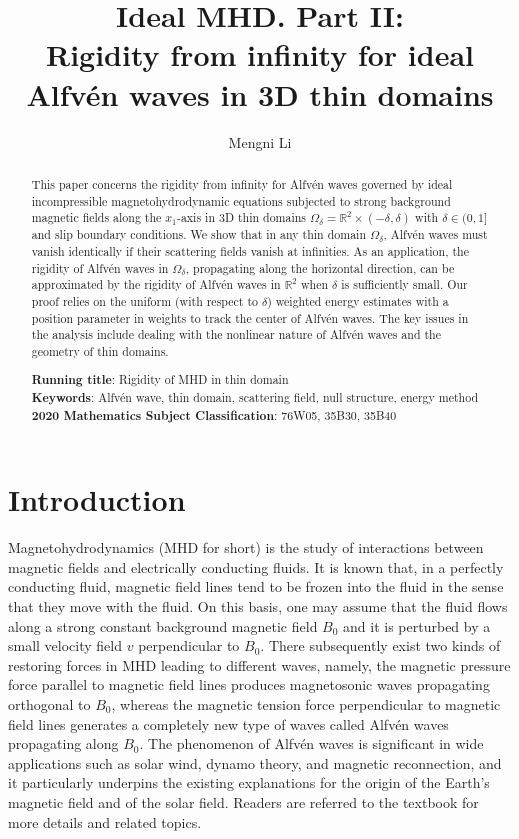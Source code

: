\documentclass[10pt,reqno]{amsart}
\title[Rigidity of MHD in thin domain]{Ideal MHD. Part II:\\ Rigidity from infinity for ideal Alfv\'en waves in 3D thin domains}
\author[Mengni Li]{Mengni Li}
\numberwithin{equation}{section}
\begin{document}
\begin{abstract}
This paper concerns 
the rigidity from infinity for Alfv\'en waves governed by  ideal incompressible magnetohydrodynamic  equations subjected to 
strong background magnetic fields 
along the $x_1$-axis in 3D  thin domains $\Omega_\delta=\mathbb{R}^2\times(-\delta,\delta)$ with $\delta\in(0,1]$ and slip boundary conditions. 
We show that 
in any thin domain $\Omega_\delta$,  
Alfv\'en waves must vanish identically if their scattering fields vanish at infinities. 
As an application, the rigidity of Alfv\'en waves in $\Omega_{\delta}$, propagating along the horizontal direction, can be approximated by the rigidity of Alfv\'en waves in $\mathbb{R}^2$ 
when $\delta$ is sufficiently small. Our proof relies on 
the uniform (with respect to $\delta$) weighted energy estimates with a position parameter in weights to track the center of Alfv\'en waves. The key issues in the analysis 
include dealing with the nonlinear nature of Alfv\'en waves and the geometry of thin domains. 



	
\smallskip
	
\noindent
\textbf{Running title}: Rigidity of MHD	in thin domain\\
\textbf{Keywords}: 	Alfv\'en wave, 
 thin domain, scattering field, null structure, energy method\\
\textbf{2020 Mathematics Subject Classification}: 76W05, 35B30, 35B40
\end{abstract}


\maketitle
\tableofcontents

\section{Introduction}



Magnetohydrodynamics (MHD for short) is the study of interactions between magnetic fields and electrically conducting fluids. 
It is known that, in a perfectly conducting fluid, magnetic field lines 
tend to be frozen into the fluid in the sense that they move with the fluid. On this basis, one may assume that the fluid flows along a strong constant background magnetic field $B_0$ and it is perturbed by a small velocity field $v$ perpendicular to $B_0$. 
There subsequently exist two kinds of restoring forces in MHD leading to different waves, namely, the magnetic pressure force parallel to magnetic field lines produces 
magnetosonic waves propagating orthogonal to $B_0$, whereas the  magnetic tension force perpendicular 
 to magnetic field lines generates a completely new type of waves called Alfv\'en waves propagating 
 along $B_0$. The phenomenon of Alfv\'en waves is significant 
  in wide applications  such as solar wind, dynamo theory, and magnetic reconnection, 
and it  particularly underpins the existing explanations for the origin of the Earth's magnetic field and of the solar field. Readers are referred to the textbook \cite{Davidson} for more details and related topics. 
 
\end{document}
